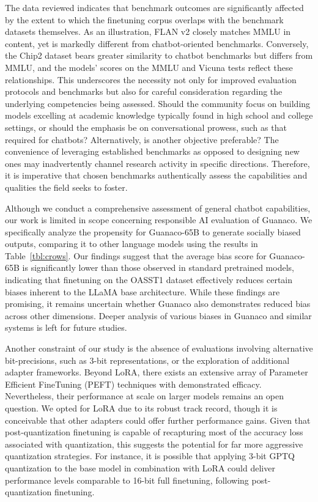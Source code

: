 The data reviewed indicates that benchmark outcomes are significantly affected by the extent to which the finetuning corpus overlaps with the benchmark datasets themselves. As an illustration, FLAN v2 closely matches MMLU in content, yet is markedly different from chatbot-oriented benchmarks. Conversely, the Chip2 dataset bears greater similarity to chatbot benchmarks but differs from MMLU, and the models’ scores on the MMLU and Vicuna tests reflect these relationships. This underscores the necessity not only for improved evaluation protocols and benchmarks but also for careful consideration regarding the underlying competencies being assessed. Should the community focus on building models excelling at academic knowledge typically found in high school and college settings, or should the emphasis be on conversational prowess, such as that required for chatbots? Alternatively, is another objective preferable? The convenience of leveraging established benchmarks as opposed to designing new ones may inadvertently channel research activity in specific directions. Therefore, it is imperative that chosen benchmarks authentically assess the capabilities and qualities the field seeks to foster.

Although we conduct a comprehensive assessment of general chatbot capabilities, our work is limited in scope concerning responsible AI evaluation of {Guanaco}. We specifically analyze the propensity for {Guanaco}-65B to generate socially biased outputs, comparing it to other language models using the results in Table~\ref{tbl:crows}. Our findings suggest that the average bias score for {Guanaco}-65B is significantly lower than those observed in standard pretrained models, indicating that finetuning on the OASST1 dataset effectively reduces certain biases inherent to the LLaMA base architecture. While these findings are promising, it remains uncertain whether {Guanaco} also demonstrates reduced bias across other dimensions. Deeper analysis of various biases in {Guanaco} and similar systems is left for future studies.

Another constraint of our study is the absence of evaluations involving alternative bit-precisions, such as 3-bit representations, or the exploration of additional adapter frameworks. Beyond LoRA, there exists an extensive array of Parameter Efficient FineTuning (PEFT) techniques with demonstrated efficacy. Nevertheless, their performance at scale on larger models remains an open question. We opted for LoRA due to its robust track record, though it is conceivable that other adapters could offer further performance gains. Given that post-quantization finetuning is capable of recapturing most of the accuracy loss associated with quantization, this suggests the potential for far more aggressive quantization strategies. For instance, it is possible that applying 3-bit GPTQ quantization to the base model in combination with LoRA could deliver performance levels comparable to 16-bit full finetuning, following post-quantization finetuning.


